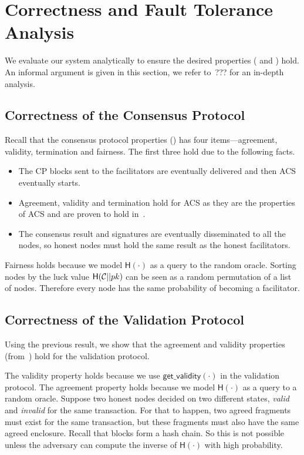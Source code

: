 \section{Correctness and Fault Tolerance Analysis}
\label{sec:analysis}
We evaluate our system analytically to ensure the desired properties ( and ) hold.
An informal argument is given in this section, we refer to~\cite[Chapter 4]{checo}??? for an in-depth analysis.

\subsection{Correctness of the Consensus Protocol}
Recall that the consensus protocol properties () has
four items---agreement, validity, termination and fairness.
The first three hold due to the following facts.
\begin{itemize}
    \item The CP blocks sent to the facilitators are eventually delivered and then ACS eventually starts.
    \item Agreement, validity and termination hold for ACS as they are the properties of ACS and are proven to hold in~\cite{miller2016honey}.
    \item The consensus result and signatures are eventually disseminated to all the nodes,
        so honest nodes must hold the same result as the honest facilitators.
\end{itemize}

Fairness holds because we model $\textsf{H}(\cdot)$ as a query to the random oracle.
Sorting nodes by the luck value $\textsf{H}(\mathcal{C} || pk)$ can be seen as a random permutation of a list of nodes.
Therefore every node has the same probability of becoming a facilitator.

\subsection{Correctness of the Validation Protocol}
\label{sec:correctness-of-validity}
Using the previous result,
we show that the agreement and validity properties (from~) hold for the validation protocol.

The validity property holds because we use $\textsf{get\_validity}(\cdot)$ in the validation protocol.
The agreement property holds because we model $\textsf{H}(\cdot)$ as a query to a random oracle.
Suppose two honest nodes decided on two different states, \emph{valid} and \emph{invalid} for the same transaction.
For that to happen, two agreed fragments must exist for the same transaction,
but these fragments must also have the same agreed enclosure.
Recall that blocks form a hash chain.
So this is not possible unless the adversary can compute the inverse of $\textsf{H}(\cdot)$ with high probability.

